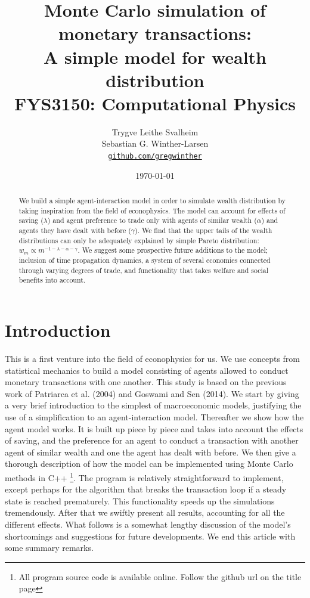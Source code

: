 \documentclass[10pt, a4paper]{amsart}
\title[Simulation of monetary transactions]{Monte Carlo simulation of monetary transactions: \\
\normalsize{A simple model for wealth distribution} \\
  \hrulefill\small{ FYS3150: Computational Physics }\hrulefill}
\author[Svalheim \& Winther-Larsen]{Trygve Leithe Svalheim \\
   Sebastian G. Winther-Larsen \\
  \href{https://github.com/gregwinther/FYS3150/}{\texttt{github.com/gregwinther}}}
\date{\today}
\begin{document}
\begin{titlepage}
\begin{abstract}
We build a simple agent-interaction model in order to simulate wealth distribution by taking inspiration from the field of econophysics. The model can account for effects of saving ($\lambda$) and agent preference to trade only with agents of similar wealth ($\alpha$) and agents they have dealt with before ($\gamma$). We find that the upper tails of the wealth distributions can only be adequately explained by simple Pareto distribution: $w_m \propto m^{-1-\lambda-\alpha-\gamma}$. We suggest some prospective future additions to the model; inclusion of time propagation dynamics, a system of several economies connected through varying degrees of trade, and functionality that takes welfare and social benefits into account.
\end{abstract}
\maketitle
\tableofcontents
\end{titlepage}

\section{Introduction}
This is a first venture into the field of econophysics for us. We use concepts from statistical mechanics to build a model consisting of agents allowed to conduct monetary transactions with one another. This study is based on the previous work of Patriarca et al. (2004)\cite{Patriarca} and Goswami and Sen (2014)\cite{GoswamiSen}. We start by giving a very brief introduction to the simplest of macroeconomic models, justifying the use of a simplification to an agent-interaction model. Thereafter we show how the agent model works. It is built up piece by piece and takes into account the effects of saving, and the preference for an agent to conduct a transaction with another agent of similar wealth and one the agent has dealt with before. We then give a thorough description of how the model can be implemented using Monte Carlo methods in C++ \footnote{All program source code is available online. Follow the github url on the title page}. The program is relatively straightforward to implement, except perhaps for the algorithm that breaks the transaction loop if a steady state is reached prematurely. This functionality speeds up the simulations tremendously. After that we swiftly present all results, accounting for all the different effects. What follows is a somewhat lengthy discussion of the model's shortcomings and suggestions for future developments. We end this article with some summary remarks.
\end{document}
